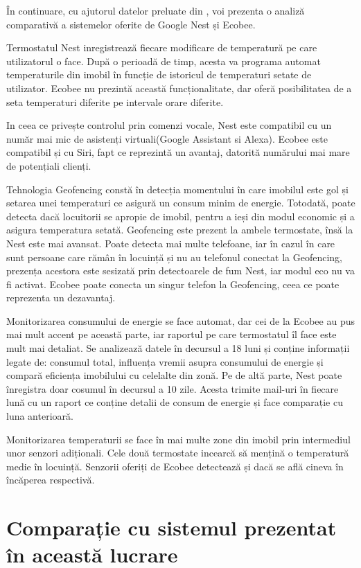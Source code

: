 	În continuare, cu ajutorul datelor preluate din \cite{ecobeeVSnest}, voi prezenta o analiză comparativă a sistemelor oferite de Google Nest și Ecobee. 

	Termostatul Nest inregistrează fiecare modificare de temperatură pe care utilizatorul o face. După o perioadă de timp, acesta va programa automat temperaturile din imobil în funcție de istoricul de temperaturi setate de utilizator. Ecobee nu prezintă această funcționalitate, dar oferă posibilitatea de a seta temperaturi diferite pe intervale orare diferite. 

	In ceea ce privește controlul prin comenzi vocale, Nest este compatibil cu un număr mai mic de asistenți virtuali(Google Assistant si Alexa). Ecobee este compatibil și cu Siri, fapt ce reprezintă un avantaj, datorită numărului mai mare de potențiali clienți. 

	Tehnologia Geofencing constă în detecția momentului în care imobilul este gol și setarea unei temperaturi ce asigură un consum minim de energie. Totodată, poate detecta dacă locuitorii se apropie de imobil, pentru a ieși din modul economic și a asigura temperatura setată. Geofencing este prezent la ambele termostate, însă la Nest este mai avansat. Poate detecta mai multe telefoane, iar în cazul în care sunt persoane care rămân în locuință și nu au telefonul conectat la Geofencing, prezența acestora este sesizată prin detectoarele de fum Nest, iar modul eco nu va fi activat. Ecobee poate conecta un singur telefon la Geofencing, ceea ce poate reprezenta un dezavantaj.

	  Monitorizarea consumului de energie se face automat, dar cei de la Ecobee au pus mai mult accent pe această parte, iar raportul pe care termostatul îl face este mult mai detaliat. Se analizează datele în decursul a 18 luni și conține informații legate de: consumul total, influența vremii asupra consumului de energie și compară eficiența imobilului cu celelalte din zonă. Pe de altă parte, Nest poate înregistra doar cosumul în decursul a 10 zile. Acesta trimite mail-uri în fiecare lună cu un raport ce conține detalii de consum de energie și face comparație cu luna anterioară.

	Monitorizarea temperaturii se face în mai multe zone din imobil prin intermediul unor senzori adiționali. Cele două termostate incearcă să mențină o temperatură medie în locuință. Senzorii oferiți de Ecobee detectează și dacă se află cineva în încăperea respectivă. 

\section{Comparație cu sistemul prezentat în această lucrare}

